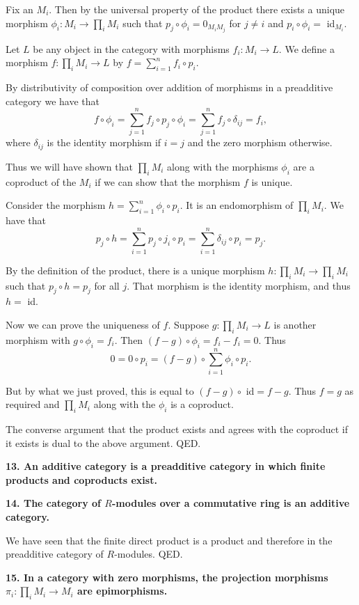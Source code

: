 \documentclass[12pt]{article}
\begin{document}
Fix an $M_i$. Then by the universal property of the product there exists a unique morphism $\phi_i : M_i \to \prod_i M_i$ such that $p_j\circ \phi_i = 0_{M_iM_j}$ for $j \neq i$ and $p_i\circ \phi_i =$ id$_{M_i}$.

Let $L$ be any object in the category with morphisms $f_i : M_i \to L$. We define a morphism $f : \prod_i M_i \to L$ by $f = \sum_{i=1}^n f_i\circ p_i$.

By distributivity of composition over addition of morphisms in a preadditive category we have that
$$f\circ \phi_i = \sum_{j=1}^n f_j\circ p_j\circ \phi_i = \sum_{j=1}^n f_j\circ \delta_{ij} = f_i,$$
where $\delta_{ij}$ is the identity morphism if $i = j$ and the zero morphism otherwise.

Thus we will have shown that $\prod_i M_i$ along with the morphisms $\phi_i$ are a coproduct of the $M_i$ if we can show that the morphism $f$ is unique.

Consider the morphism $h = \sum_{i=1}^n \phi_i\circ p_i$. It is an endomorphism of $\prod_i M_i$. We have that
$$p_j\circ h = \sum_{i=1}^n p_j\circ j_i\circ p_i = \sum_{i=1}^n \delta_{ij}\circ p_i = p_j.$$

By the definition of the product, there is a unique morphism $h : \prod_i M_i \to \prod_i M_i$ such that $p_j\circ h = p_j$ for all $j$. That morphism is the identity morphism, and thus $h =$ id. 

Now we can prove the uniqueness of $f$. Suppose $g : \prod_i M_i \to L$ is another morphism with $g\circ \phi_i = f_i$. Then $(f - g)\circ \phi_i = f_i - f_i = 0$. Thus
$$0 = 0\circ p_i = (f - g)\circ \sum_{i=1}^n \phi_i\circ p_i.$$

But by what we just proved, this is equal to $(f - g)\circ$ id$ = f - g$. Thus $f = g$ as required and $\prod_i M_i$ along with the $\phi_i$ is a coproduct. 

The converse argument that the product exists and agrees with the coproduct if it exists is dual to the above argument. QED.

\textbf{13. An additive category is a preadditive category in which finite products and coproducts exist.}

\textbf{14. The category of $R$-modules over a commutative ring is an additive category.}

We have seen that the finite direct product is a product and therefore in the preadditive category of $R$-modules. QED.

\textbf{15. In a category with zero morphisms, the projection morphisms $\pi_i : \prod_i M_i \to M_i$ are epimorphisms.}
\end{document}
